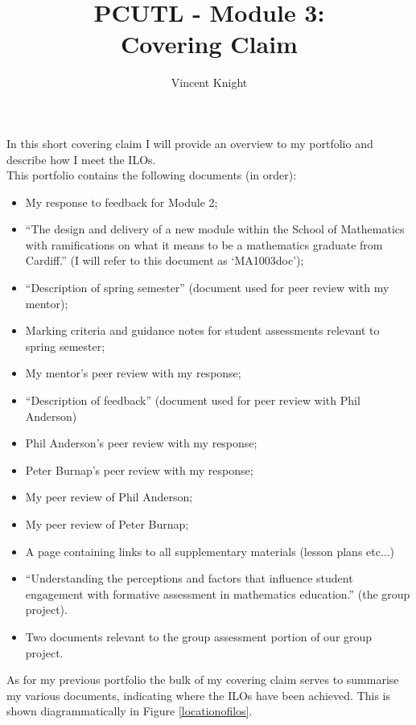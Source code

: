 \documentclass{article}
\title{PCUTL - Module 3:\\ Covering Claim}
\author{Vincent Knight}
\date{}
\begin{document}
\maketitle

In this short covering claim I will provide an overview to my portfolio and describe how I meet the ILOs.\\

This portfolio contains the following documents (in order):

\begin{itemize}
    \item My response to feedback for Module 2;
    \item ``The design and delivery of a new module within the School of Mathematics with ramifications on what it means to be a mathematics graduate from Cardiff.'' (I will refer to this document as `MA1003doc');
    \item ``Description of spring semester'' (document used for peer review with my mentor);
    \item Marking criteria and guidance notes for student assessments relevant to spring semester;
    \item My mentor's peer review with my response;
    \item ``Description of feedback'' (document used for peer review with Phil Anderson)
    \item Phil Anderson's peer review with my response;
    \item Peter Burnap's peer review with my response;
    \item My peer review of Phil Anderson;
    \item My peer review of Peter Burnap;
    \item A page containing links to all supplementary materials (lesson plans etc...)
    \item ``Understanding the perceptions and factors that influence student engagement with formative assessment in mathematics education.'' (the group project).
    \item Two documents relevant to the group assessment portion of our group project.
\end{itemize}

As for my previous portfolio the bulk of my covering claim serves to summarise my various documents, indicating where the ILOs have been achieved. This is shown diagrammatically in Figure \ref{locationofilos}.
\end{document}
